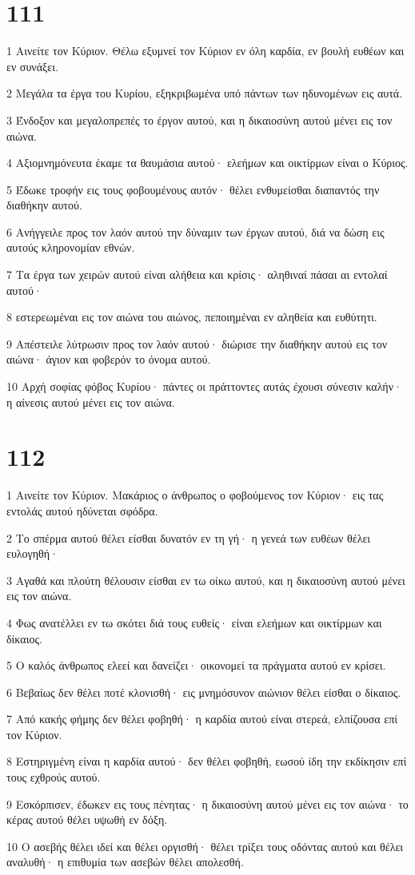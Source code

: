 \chapter{111}

\par 1 Αινείτε τον Κύριον. Θέλω εξυμνεί τον Κύριον εν όλη καρδία, εν βουλή ευθέων και εν συνάξει.
\par 2 Μεγάλα τα έργα του Κυρίου, εξηκριβωμένα υπό πάντων των ηδυνομένων εις αυτά.
\par 3 Ένδοξον και μεγαλοπρεπές το έργον αυτού, και η δικαιοσύνη αυτού μένει εις τον αιώνα.
\par 4 Αξιομνημόνευτα έκαμε τα θαυμάσια αυτού· ελεήμων και οικτίρμων είναι ο Κύριος.
\par 5 Έδωκε τροφήν εις τους φοβουμένους αυτόν· θέλει ενθυμείσθαι διαπαντός την διαθήκην αυτού.
\par 6 Ανήγγειλε προς τον λαόν αυτού την δύναμιν των έργων αυτού, διά να δώση εις αυτούς κληρονομίαν εθνών.
\par 7 Τα έργα των χειρών αυτού είναι αλήθεια και κρίσις· αληθιναί πάσαι αι εντολαί αυτού·
\par 8 εστερεωμέναι εις τον αιώνα του αιώνος, πεποιημέναι εν αληθεία και ευθύτητι.
\par 9 Απέστειλε λύτρωσιν προς τον λαόν αυτού· διώρισε την διαθήκην αυτού εις τον αιώνα· άγιον και φοβερόν το όνομα αυτού.
\par 10 Αρχή σοφίας φόβος Κυρίου· πάντες οι πράττοντες αυτάς έχουσι σύνεσιν καλήν· η αίνεσις αυτού μένει εις τον αιώνα.

\chapter{112}

\par 1 Αινείτε τον Κύριον. Μακάριος ο άνθρωπος ο φοβούμενος τον Κύριον· εις τας εντολάς αυτού ηδύνεται σφόδρα.
\par 2 Το σπέρμα αυτού θέλει είσθαι δυνατόν εν τη γή· η γενεά των ευθέων θέλει ευλογηθή·
\par 3 Αγαθά και πλούτη θέλουσιν είσθαι εν τω οίκω αυτού, και η δικαιοσύνη αυτού μένει εις τον αιώνα.
\par 4 Φως ανατέλλει εν τω σκότει διά τους ευθείς· είναι ελεήμων και οικτίρμων και δίκαιος.
\par 5 Ο καλός άνθρωπος ελεεί και δανείζει· οικονομεί τα πράγματα αυτού εν κρίσει.
\par 6 Βεβαίως δεν θέλει ποτέ κλονισθή· εις μνημόσυνον αιώνιον θέλει είσθαι ο δίκαιος.
\par 7 Από κακής φήμης δεν θέλει φοβηθή· η καρδία αυτού είναι στερεά, ελπίζουσα επί τον Κύριον.
\par 8 Εστηριγμένη είναι η καρδία αυτού· δεν θέλει φοβηθή, εωσού ίδη την εκδίκησιν επί τους εχθρούς αυτού.
\par 9 Εσκόρπισεν, έδωκεν εις τους πένητας· η δικαιοσύνη αυτού μένει εις τον αιώνα· το κέρας αυτού θέλει υψωθή εν δόξη.
\par 10 Ο ασεβής θέλει ιδεί και θέλει οργισθή· θέλει τρίξει τους οδόντας αυτού και θέλει αναλυθή· η επιθυμία των ασεβών θέλει απολεσθή.

